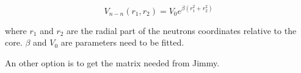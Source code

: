 \documentclass[12pt,a4paper]{article}
\begin{document}
\begin{equation}
V_{n-n}(r_{1} , r_{2}) = V_{0}e^{ \beta (r_1^2 + r_2^2)}
\end{equation}

where $r_1$ and $r_2$ are the radial part of the neutrons coordinates relative to the core. $\beta$ and $V_{0}$ are parameters need to be fitted. 

An other option is to get the matrix needed from Jimmy.



\end{document}
